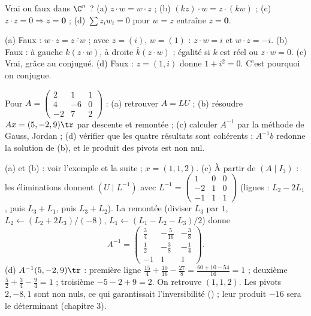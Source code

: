 \begin{exo}
Vrai ou faux dans $\C^n$ ? (a) $z\cdot w=w\cdot z$ ; (b) $(kz)\cdot w=z\cdot(kw)$ ; (c) $z\cdot z=0\Rightarrow z=\mathbf 0$ ; (d) $\sum z_iw_i=0$ pour $w=z$ entraîne $z=\mathbf 0$.
\begin{corrige}
(a) Faux : $w\cdot z=\overline{z\cdot w}$ ; avec $z=(i)$, $w=(1)$ : $z\cdot w=i$ et $w\cdot z=-i$. (b) Faux : à gauche $k(z\cdot w)$, à droite $\overline k(z\cdot w)$ ; égalité si $k$ est réel ou $z\cdot w=0$. (c) Vrai, grâce au conjugué. (d) Faux : $z=(1,i)$ donne $1+i^2=0$. C'est pourquoi on conjugue.
\end{corrige}
\end{exo}

\begin{exo}
Pour $A=\begin{pmatrix}2&1&1\\4&-6&0\\-2&7&2\end{pmatrix}$ : (a) retrouver $A=LU$ ; (b) résoudre $Ax=(5,-2,9)\tr$ par descente et remontée ; (c) calculer $A^{-1}$ par la méthode de Gauss, Jordan ; (d) vérifier que les quatre résultats sont cohérents : $A^{-1}b$ redonne la solution de (b), et le produit des pivots est non nul.
\begin{corrige}
(a) et (b) : voir l'exemple  et la suite ; $x=(1,1,2)$.
(c) À partir de $(A\mid I_3)$ : les éliminations donnent $(U\mid L^{-1})$ avec $L^{-1}=\begin{pmatrix}1&0&0\\-2&1&0\\-1&1&1\end{pmatrix}$ (lignes : $L_2-2L_1$, puis $L_3+L_1$, puis $L_3+L_2$). La remontée (diviser $L_3$ par $1$, $L_2\leftarrow(L_2+2L_3)/(-8)$, $L_1\leftarrow(L_1-L_2-L_3)/2$) donne
\[A^{-1}=\begin{pmatrix}\frac34&-\frac5{16}&-\frac38\\[2pt]\frac12&-\frac38&-\frac14\\[2pt]-1&1&1\end{pmatrix}.\]
(d) $A^{-1}(5,-2,9)\tr$ : première ligne $\frac{15}4+\frac{10}{16}-\frac{27}8=\frac{60+10-54}{16}=1$ ; deuxième $\frac52+\frac34-\frac94=1$ ; troisième $-5-2+9=2$. On retrouve $(1,1,2)$. Les pivots $2,-8,1$ sont non nuls, ce qui garantissait l'inversibilité () ; leur produit $-16$ sera le déterminant (chapitre 3).
\end{corrige}
\end{exo}
